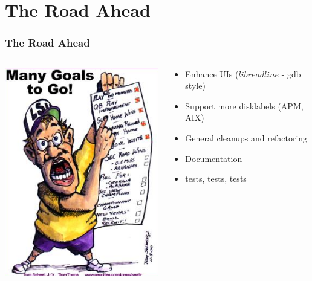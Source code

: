 
\section{The Road Ahead}
\begin{frame}\frametitle{The Road Ahead}
  \begin{columns}
    \begin{column}{.5\linewidth}
      \includegraphics[scale=0.4]{img/goals}
    \end{column}
    \begin{column}{.5\linewidth}
      \begin{itemize}
      \item Enhance UIs ($libreadline$ - gdb style)
      \item Support more disklabels (APM, AIX)
      \item General cleanups and refactoring
      \item Documentation
      \item tests, tests, tests
      \end{itemize}
    \end{column}
  \end{columns}      
\end{frame}
